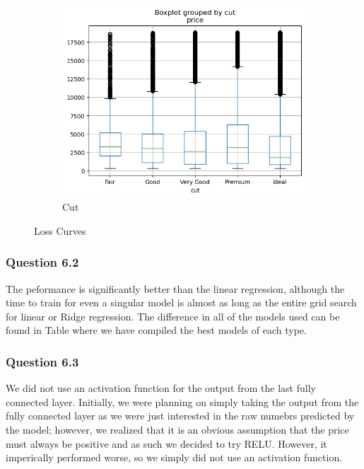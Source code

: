 \documentclass[11pt,letterpaper]{article}
\begin{document}
\begin{figure}[H]
\begin{subfigure}[b]{0.3\textwidth}
        \centering
        \includegraphics[width=\textwidth]{../Figures/Question-1/cutBox.png}
        \caption{Cut}
        \label{fig:cutBox}
    \end{subfigure}
       \caption{Loss Curves}
       \label{fig:boxPlots}
\end{figure}


\subsubsection*{Question 6.2}
The peformance is significantly better than the linear regression, although the time to train for even a singular 
model is almost as long as the entire grid search for linear or Ridge regression. The difference in all of the models
used can be found in Table where we have compiled the best models of each type. 
\subsubsection*{Question 6.3}
We did not use an activation function for the output from the last fully connected layer. Initially, we were planning on 
simply taking the output from the fully connected layer as we were just interested in the raw numebrs predicted by 
the model; however, we realized that it is an obvious assumption that the price must always be positive and as such
we decided to try RELU. However, it imperically performed worse, so we simply did not use an activation function. 
\end{document}
